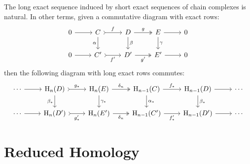 \begin{proposition}
    \label{prop:long-exact-sequence-construction-is-natural}
    The long exact sequence induced by short exact sequences of chain complexes is
    natural. In other terms, given a commutative diagram with exact rows:
    \[
        \begin{tikzcd}
            0 \ar[r]
            &C \ar[r, "f", tail] \ar[d, "\alpha"']
            &D \ar[r, "g", two heads] \ar[d, "\beta"]
            &E \ar[r] \ar[d, "\gamma"]
            &0
            \\
            0 \ar[r]
            &C' \ar[r, "f'"', tail]
            &D' \ar[r, "g'"', two heads]
            &E' \ar[r]
            &0
        \end{tikzcd}
    \]
    then the following diagram with long exact rows commutes:
    \[
        \begin{tikzcd}
            \cdots \ar[r]
            &\Hmlg_n(D) \ar[r, "g_{*}", tail] \ar[d, "\beta_{*}"']
            &\Hmlg_n(E) \ar[r, "\delta_n", two heads] \ar[d, "\gamma_{*}"]
            &\Hmlg_{n-1}(C) \ar[r, "f_{*}"] \ar[d, "\alpha_{*}"]
            &\Hmlg_{n-1}(D) \ar[r] \ar[d, "\beta_{*}"]
            &\cdots
            \\
            \cdots \ar[r]
            &\Hmlg_n(D') \ar[r, "g_{*}'"', tail]
            &\Hmlg_n(E') \ar[r, "\delta_n"', two heads]
            &\Hmlg_{n-1}(C') \ar[r, "f_{*}'"']
            &\Hmlg_{n-1}(D') \ar[r]
            &\cdots
        \end{tikzcd}
    \]
\end{proposition}


\section{Reduced Homology}

